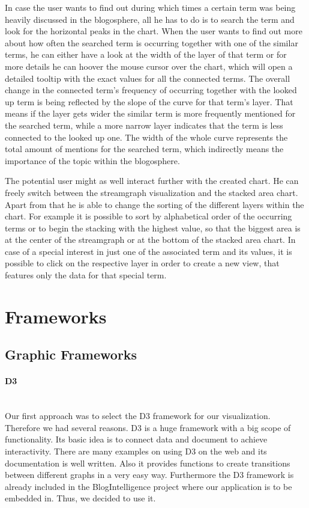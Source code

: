 \documentclass{llncs}
\newcommand{\myparagraph}[1]{\paragraph{#1}\mbox{}\\}
\begin{document}
In case the user wants to find out during which times a certain term was being heavily discussed in the blogosphere, all he has to do is to search the term and look for the horizontal peaks in the chart. When the user wants to find out more about how often the searched term is occurring together with one of the similar terms, he can either have a look at the width of the layer of that term or for more details he can hoover the mouse cursor over the chart, which will open a detailed tooltip with the exact values for all the connected terms. The overall change in the connected term's frequency of occurring together with the looked up term is being reflected by the slope of the curve for that term's layer. That means if the layer gets wider the similar term is more frequently mentioned for the searched term, while a more narrow layer indicates that the term is less connected to the looked up one. The width of the whole curve represents the total amount of mentions for the searched term, which indirectly means the importance of the topic within the blogosphere.


The potential user might as well interact further with the created chart. He can freely switch between the streamgraph visualization and the stacked area chart. Apart from that he is able to change the sorting of the different layers within the chart. For example it is possible to sort by alphabetical order of the occurring terms or to begin the stacking with the highest value, so that the biggest area is at the center of the streamgraph or at the bottom of the stacked area chart. In case of a special interest in just one of the associated term and its values, it is possible to click on the respective layer in order to create a new view, that features only the data for that special term.



\section{Frameworks}

\subsection{Graphic Frameworks}

\myparagraph{D3}
Our first approach was to select the D3 framework for our visualization. Therefore we had several reasons. D3 is a huge framework with a big scope of functionality. Its basic idea is to connect data and document to achieve interactivity. There are many examples on using D3 on the web and its documentation is well written. Also it provides functions to create transitions between different graphs in a very easy way. Furthermore the D3 framework is already included in the BlogIntelligence project where our application is to be embedded in. Thus, we decided to use it.
\end{document}
